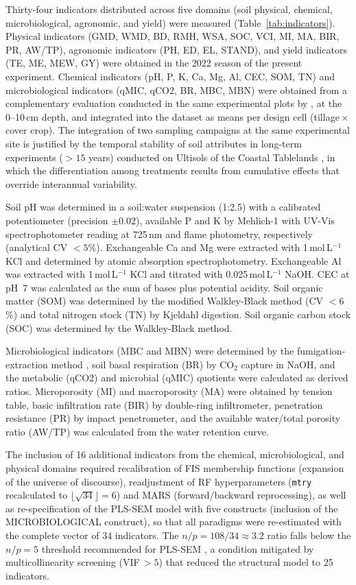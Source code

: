 \documentclass[pdflatex,sn-basic]{sn-jnl}%
\begin{document}
Thirty-four indicators distributed across five domains (soil physical, chemical, microbiological, agronomic, and yield) were measured (Table~\ref{tab:indicators}). Physical indicators (GMD, WMD, BD, RMH, WSA, SOC, VCI, MI, MA, BIR, PR, AW/TP), agronomic indicators (PH, ED, EL, STAND), and yield indicators (TE, ME, MEW, GY) were obtained in the 2022 season of the present experiment. Chemical indicators (pH, P, K, Ca, Mg, Al, CEC, SOM, TN) and microbiological indicators (qMIC, qCO2, BR, MBC, MBN) were obtained from a complementary evaluation conducted in the same experimental plots by \cite{Sara2019}, at the 0--10\,cm depth, and integrated into the dataset as means per design cell (tillage\,$\times$\,cover crop). The integration of two sampling campaigns at the same experimental site is justified by the temporal stability of soil attributes in long-term experiments ($> 15$ years) conducted on Ultisols of the Coastal Tablelands \citep{Assuncao2023}, in which the differentiation among treatments results from cumulative effects that override interannual variability.

Soil pH was determined in a soil:water suspension (1:2.5) with a calibrated potentiometer (precision $\pm 0.02$), available P and K by Mehlich-1 with UV-Vis spectrophotometer reading at 725\,nm and flame photometry, respectively (analytical CV $< 5$\%). Exchangeable Ca and Mg were extracted with 1\,mol\,L$^{-1}$ KCl and determined by atomic absorption spectrophotometry. Exchangeable Al was extracted with 1\,mol\,L$^{-1}$ KCl and titrated with 0.025\,mol\,L$^{-1}$ NaOH. CEC at pH~7 was calculated as the sum of bases plus potential acidity. Soil organic matter (SOM) was determined by the modified Walkley-Black method (CV $< 6$\%) and total nitrogen stock (TN) by Kjeldahl digestion. Soil organic carbon stock (SOC) was determined by the Walkley-Black method.

Microbiological indicators (MBC and MBN) were determined by the fumigation-extraction method \citep{Vance1987}, soil basal respiration (BR) by CO$_2$ capture in NaOH, and the metabolic (qCO2) and microbial (qMIC) quotients were calculated as derived ratios. Microporosity (MI) and macroporosity (MA) were obtained by tension table, basic infiltration rate (BIR) by double-ring infiltrometer, penetration resistance (PR) by impact penetrometer, and the available water/total porosity ratio (AW/TP) was calculated from the water retention curve.

The inclusion of 16 additional indicators from the chemical, microbiological, and physical domains required recalibration of FIS membership functions (expansion of the universe of discourse), readjustment of RF hyperparameters (\texttt{mtry} recalculated to $\lfloor \sqrt{34} \rfloor = 6$) and MARS (forward/backward reprocessing), as well as re-specification of the PLS-SEM model with five constructs (inclusion of the MICROBIOLOGICAL construct), so that all paradigms were re-estimated with the complete vector of 34 indicators. The $n/p = 108/34 \approx 3.2$ ratio falls below the $n/p = 5$ threshold recommended for PLS-SEM \citep{Hair2019}, a condition mitigated by multicollinearity screening (VIF\,$> 5$) that reduced the structural model to 25 indicators.
\end{document}
